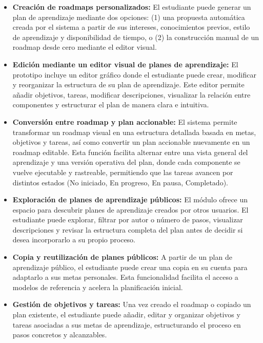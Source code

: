 \begin{itemize}

\item \textbf{Creación de roadmaps personalizados:} El estudiante puede generar un plan de aprendizaje mediante dos opciones: (1) una propuesta automática creada por el sistema a partir de sus intereses, conocimientos previos, estilo de aprendizaje y disponibilidad de tiempo, o (2) la construcción manual de un roadmap desde cero mediante el editor visual.

\item \textbf{Edición mediante un editor visual de planes de aprendizaje:} El prototipo incluye un editor gráfico donde el estudiante puede crear, modificar y reorganizar la estructura de su plan de aprendizaje. Este editor permite añadir objetivos, tareas, modificar descripciones, visualizar la relación entre componentes y estructurar el plan de manera clara e intuitiva.

\item \textbf{Conversión entre roadmap y plan accionable:} El sistema permite transformar un roadmap visual en una estructura detallada basada en metas, objetivos y tareas, así como convertir un plan accionable nuevamente en un roadmap editable. Esta función facilita alternar entre una vista general del aprendizaje y una versión operativa del plan, donde cada componente se vuelve ejecutable y rastreable, permitiendo que las tareas avancen por distintos estados (No iniciado, En progreso, En pausa, Completado).

\item \textbf{Exploración de planes de aprendizaje públicos:} El módulo ofrece un espacio para descubrir planes de aprendizaje creados por otros usuarios. El estudiante puede explorar, filtrar por autor o número de pasos, visualizar descripciones y revisar la estructura completa del plan antes de decidir si desea incorporarlo a su propio proceso.

\item \textbf{Copia y reutilización de planes públicos:} A partir de un plan de aprendizaje público, el estudiante puede crear una copia en su cuenta para adaptarlo a sus metas personales. Esta funcionalidad facilita el acceso a modelos de referencia y acelera la planificación inicial.

\item \textbf{Gestión de objetivos y tareas:} Una vez creado el roadmap o copiado un plan existente, el estudiante puede añadir, editar y organizar objetivos y tareas asociadas a sus metas de aprendizaje, estructurando el proceso en pasos concretos y alcanzables.


\end{itemize}
